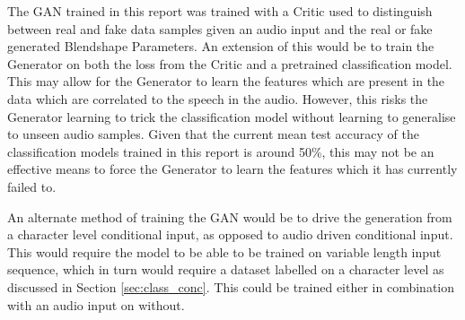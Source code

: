The GAN trained in this report was trained with a Critic used to distinguish between real and fake data samples given an audio input and the real or fake generated Blendshape Parameters.
An extension of this would be to train the Generator on both the loss from the Critic and a pretrained classification model.
This may allow for the Generator to learn the features which are present in the data which are correlated to the speech in the audio.
However, this risks the Generator learning to trick the classification model without learning to generalise to unseen audio samples.
Given that the current mean test accuracy of the classification models trained in this report is around 50\%, this may not be an effective means to force the Generator to learn the features which it has currently failed to.

An alternate method of training the GAN would be to drive the generation from a character level conditional input, as opposed to audio driven conditional input.
This would require the model to be able to be trained on variable length input sequence, which in turn would require a dataset labelled on a character level as discussed in Section \ref{sec:class_conc}.
This could be trained either in combination with an audio input on without.
